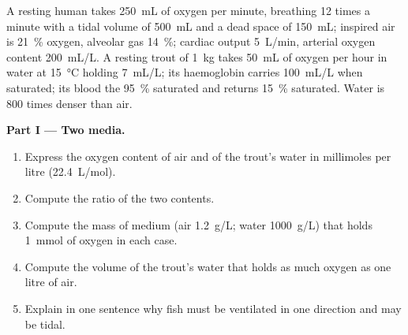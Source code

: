 \begin{problem}
\label{pb:b1:gas-exchange:1}
A resting human takes \qty{250}{mL} of oxygen per minute, breathing
\qty{12}{} times a minute with a tidal volume of \qty{500}{mL} and a
dead space of \qty{150}{mL}; inspired air is \qty{21}{\%} oxygen,
alveolar gas \qty{14}{\%}; cardiac output \qty{5}{L/min}, arterial
oxygen content \qty{200}{mL/L}. A resting trout of \qty{1}{kg} takes
\qty{50}{mL} of oxygen per hour in water at \qty{15}{\celsius} holding
\qty{7}{mL/L}; its haemoglobin carries \qty{100}{mL/L} when saturated;
its blood  the  \qty{95}{\%} saturated and returns
\qty{15}{\%} saturated. Water is \qty{800}{} times denser than air.

\medskip
\noindent\textbf{Part I --- Two media.}
\begin{enumerate}
  \item Express the oxygen content of air and of the trout's water in
        millimoles per litre (\qty{22.4}{L/mol}).
  \item Compute the ratio of the two contents.
  \item Compute the mass of medium (air \qty{1.2}{g/L}; water
        \qty{1000}{g/L}) that holds \qty{1}{mmol} of oxygen in each
        case.
  \item Compute the volume of the trout's water that holds as much
        oxygen as one litre of air.
  \item Explain in one sentence why fish  must be ventilated in
        one direction and  may be tidal.
\end{enumerate}


\end{problem}
